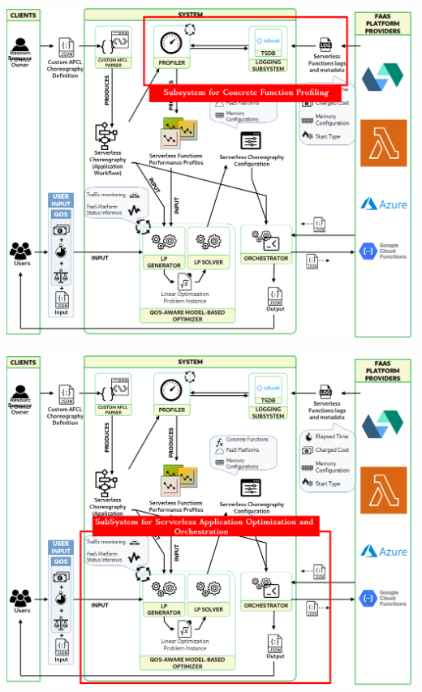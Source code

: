 \documentclass[13.5pt]{beamer}
\begin{document}
\begin{frame}[noframenumbering]
	
	\begin{center}
		\includegraphics[width=\textwidth,height=0.95\textheight]{../Images/SystemForSlide1.png}
	\end{center}
	
	
\end{frame} 
\begin{frame}[noframenumbering]
	
	\begin{center}
		\includegraphics[width=\textwidth,height=0.95\textheight]{../Images/SystemForSlide2.png}
	\end{center}
	
	
\end{frame} 
\end{document}
